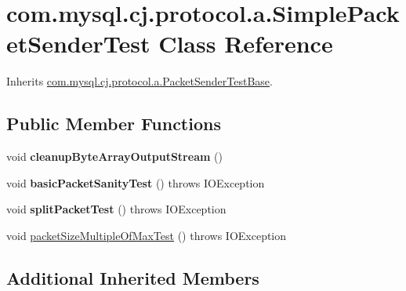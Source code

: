 \hypertarget{classcom_1_1mysql_1_1cj_1_1protocol_1_1a_1_1_simple_packet_sender_test}{}\section{com.\+mysql.\+cj.\+protocol.\+a.\+Simple\+Packet\+Sender\+Test Class Reference}
\label{classcom_1_1mysql_1_1cj_1_1protocol_1_1a_1_1_simple_packet_sender_test}


Inherits \mbox{\hyperlink{classcom_1_1mysql_1_1cj_1_1protocol_1_1a_1_1_packet_sender_test_base}{com.\+mysql.\+cj.\+protocol.\+a.\+Packet\+Sender\+Test\+Base}}.

\subsection*{Public Member Functions}
\begin{DoxyCompactItemize}
\item 
\mbox{\label{classcom_1_1mysql_1_1cj_1_1protocol_1_1a_1_1_simple_packet_sender_test_a5c78726ca165427e15d365c78cfcb2ea}} 
void {\bfseries cleanup\+Byte\+Array\+Output\+Stream} ()
\item 
\mbox{\label{classcom_1_1mysql_1_1cj_1_1protocol_1_1a_1_1_simple_packet_sender_test_a1e427d6e3fdd095ee9b5788a65a72bc2}} 
void {\bfseries basic\+Packet\+Sanity\+Test} ()  throws I\+O\+Exception 
\item 
\mbox{\label{classcom_1_1mysql_1_1cj_1_1protocol_1_1a_1_1_simple_packet_sender_test_a2e967f47da2c1c278edc1d355c9d4a89}} 
void {\bfseries split\+Packet\+Test} ()  throws I\+O\+Exception 
\item 
void \mbox{\hyperlink{classcom_1_1mysql_1_1cj_1_1protocol_1_1a_1_1_simple_packet_sender_test_a5936ffe2c8c3738af9838f7fa5a05624}{packet\+Size\+Multiple\+Of\+Max\+Test}} ()  throws I\+O\+Exception 
\end{DoxyCompactItemize}
\subsection*{Additional Inherited Members}


